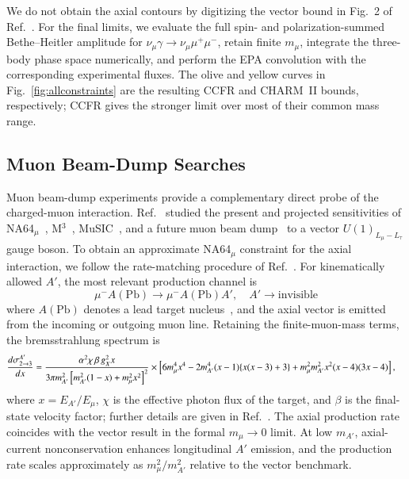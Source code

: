 \documentclass[onecolumn, aps, nofootinbib, prd, preprint, floats, floatfix, amsmath, amssymb, superscriptaddress, preprintnumbers]{revtex4-2}
\begin{document}
We do not obtain the axial contours by digitizing the vector bound in Fig.~2 of Ref.~\cite{Altmannshofer:2014pba}. For the final limits, we evaluate the full spin- and polarization-summed Bethe--Heitler amplitude for $\nu_\mu\gamma\to\nu_\mu\mu^+\mu^-$, retain finite $m_\mu$, integrate the three-body phase space numerically, and perform the EPA convolution with the corresponding experimental fluxes. The olive and yellow curves in Fig.~\ref{fig:allconstraints} are the resulting CCFR and CHARM~II bounds, respectively; CCFR gives the stronger limit over most of their common mass range.


\subsection{Muon Beam-Dump Searches}
\label{subsec:muon-beam-dump}

Muon beam-dump experiments provide a complementary direct probe of the charged-muon interaction. Ref.~\cite{Chakraborty:2025jbd} studied the present and projected sensitivities of NA64$_\mu$~\cite{NA64:2024nwj}, M$^3$~\cite{Kahn:2018cqs}, MuSIC~\cite{Acosta:2021qpx,Acosta:2022ejc}, and a future muon beam dump~\cite{Cesarotti:2022ttv} to a vector $U(1)_{L_\mu-L_\tau}$ gauge boson. To obtain an approximate NA64$_\mu$ constraint for the axial interaction, we follow the rate-matching procedure of Ref.~\cite{Chakraborty:2025jbd}.
For kinematically allowed $A'$, the most relevant production channel is
\begin{equation}
\mu^- A(\text{Pb}) \to \mu^- A(\text{Pb}) A', \quad A' \to \text{invisible}
\label{eq:NA64production}
\end{equation}
where $A(\mathrm{Pb})$ denotes a lead target nucleus~\cite{andreev2024exploration}, and the axial vector is emitted from the incoming or outgoing muon line. Retaining the finite-muon-mass terms, the bremsstrahlung spectrum is~\cite{Chakraborty:2025jbd}
\begin{equation}
\begin{aligned}
\small
\frac{d\sigma^{A'}_{2\to 3}}{dx}
&=\frac{\alpha^2\chi\,\beta\,g_X^2 x}{3\pi m_{A'}^2\left[m_{A'}^2(1-x)+m_\mu^2x^2\right]^2} \times\left[ 6m_\mu^4x^4 -2m_{A'}^4(x-1)\{x(x-3)+3\} +m_\mu^2m_{A'}^2x^2(x-4)(3x-4) \right],
\label{eq:beamdump-axial-spectrum}
\end{aligned}
\end{equation}
where $x=E_{A'}/E_\mu$, $\chi$ is the effective photon flux of the target, and $\beta$ is the final-state velocity factor; further details are given in Ref.~\cite{Chakraborty:2025jbd}. The axial production rate coincides with the vector result in the formal $m_\mu\to0$ limit. At low $m_{A'}$, axial-current nonconservation enhances longitudinal $A'$ emission, and the production rate scales approximately as $m_\mu^2/m_{A'}^2$ relative to the vector benchmark.
\end{document}
